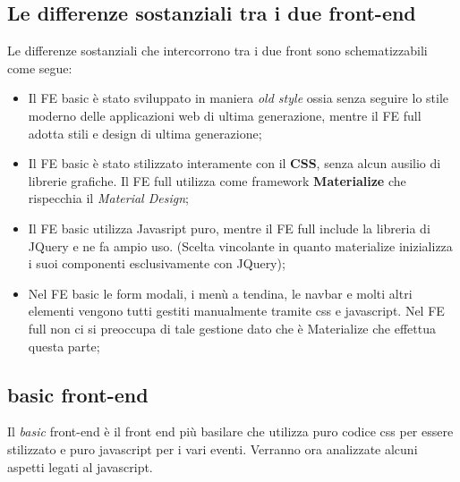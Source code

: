 \subsection{Le differenze sostanziali tra i due front-end}
Le differenze sostanziali che intercorrono tra i due front sono schematizzabili come segue:
\begin{itemize}
\item Il FE basic è stato sviluppato in maniera \textit{old style} ossia senza seguire lo stile moderno delle applicazioni web di ultima generazione, mentre il FE full adotta stili e design di ultima generazione;
\item Il FE basic è stato stilizzato interamente con il \textbf{CSS}, senza alcun ausilio di librerie grafiche. Il FE full utilizza come framework \textbf{Materialize} che rispecchia il \textit{Material Design};
\item Il FE basic utilizza Javasript puro, mentre il FE full include la libreria di JQuery e ne fa ampio uso. (Scelta vincolante in quanto materialize inizializza i suoi componenti esclusivamente con JQuery);
\item Nel FE basic le form modali, i menù a tendina, le navbar e molti altri elementi vengono tutti gestiti manualmente tramite css e javascript. Nel FE full non ci si preoccupa di tale gestione dato che è Materialize che effettua questa parte;
\end{itemize} 
\subsection{basic front-end}
Il \textit{basic} front-end è il front end più basilare che utilizza puro codice css per essere stilizzato e puro javascript per i vari eventi.
Verranno ora analizzate alcuni aspetti legati al javascript.

